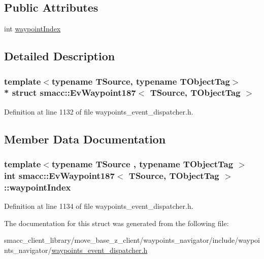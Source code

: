 \subsection*{Public Attributes}
\begin{DoxyCompactItemize}
\item 
int \hyperlink{structsmacc_1_1EvWaypoint187_a032fa62a417a81ec8aebb08967fcff5e}{waypoint\+Index}
\end{DoxyCompactItemize}


\subsection{Detailed Description}
\subsubsection*{template$<$typename T\+Source, typename T\+Object\+Tag$>$\\*
struct smacc\+::\+Ev\+Waypoint187$<$ T\+Source, T\+Object\+Tag $>$}



Definition at line 1132 of file waypoints\+\_\+event\+\_\+dispatcher.\+h.



\subsection{Member Data Documentation}
\subsubsection[{\texorpdfstring{waypoint\+Index}{waypointIndex}}]{\setlength{\rightskip}{0pt plus 5cm}template$<$typename T\+Source , typename T\+Object\+Tag $>$ int {\bf smacc\+::\+Ev\+Waypoint187}$<$ T\+Source, T\+Object\+Tag $>$\+::waypoint\+Index}\hypertarget{structsmacc_1_1EvWaypoint187_a032fa62a417a81ec8aebb08967fcff5e}{}\label{structsmacc_1_1EvWaypoint187_a032fa62a417a81ec8aebb08967fcff5e}


Definition at line 1134 of file waypoints\+\_\+event\+\_\+dispatcher.\+h.



The documentation for this struct was generated from the following file\+:\begin{DoxyCompactItemize}
\item 
smacc\+\_\+client\+\_\+library/move\+\_\+base\+\_\+z\+\_\+client/waypoints\+\_\+navigator/include/waypoints\+\_\+navigator/\hyperlink{waypoints__event__dispatcher_8h}{waypoints\+\_\+event\+\_\+dispatcher.\+h}\end{DoxyCompactItemize}
